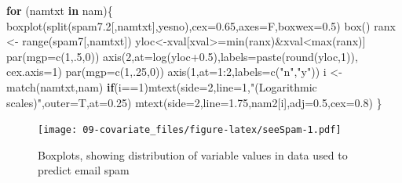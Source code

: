 \documentclass[
  10pt,
  b5paper]{book}
\newenvironment{Shaded}{\begin{snugshade}}{\end{snugshade}}
\newcommand{\AttributeTok}[1]{\textcolor[rgb]{0.77,0.63,0.00}{#1}}
\newcommand{\ControlFlowTok}[1]{\textcolor[rgb]{0.13,0.29,0.53}{\textbf{#1}}}
\newcommand{\DecValTok}[1]{\textcolor[rgb]{0.00,0.00,0.81}{#1}}
\newcommand{\FloatTok}[1]{\textcolor[rgb]{0.00,0.00,0.81}{#1}}
\newcommand{\FunctionTok}[1]{\textcolor[rgb]{0.00,0.00,0.00}{#1}}
\newcommand{\NormalTok}[1]{#1}
\newcommand{\OtherTok}[1]{\textcolor[rgb]{0.56,0.35,0.01}{#1}}
\newcommand{\SpecialCharTok}[1]{\textcolor[rgb]{0.00,0.00,0.00}{#1}}
\newcommand{\StringTok}[1]{\textcolor[rgb]{0.31,0.60,0.02}{#1}}
\begin{document}
\begin{Shaded}
\begin{Highlighting}[]
  \ControlFlowTok{for}\NormalTok{ (namtxt }\ControlFlowTok{in}\NormalTok{ nam)\{}
    \FunctionTok{boxplot}\NormalTok{(}\FunctionTok{split}\NormalTok{(spam7}\FloatTok{.2}\NormalTok{[,namtxt],yesno),}\AttributeTok{cex=}\FloatTok{0.65}\NormalTok{,}\AttributeTok{axes=}\NormalTok{F,}\AttributeTok{boxwex=}\FloatTok{0.5}\NormalTok{)}
    \FunctionTok{box}\NormalTok{()}
\NormalTok{    ranx }\OtherTok{\textless{}{-}} \FunctionTok{range}\NormalTok{(spam7[,namtxt])}
\NormalTok{    yloc}\OtherTok{\textless{}{-}}\NormalTok{xval[xval}\SpecialCharTok{\textgreater{}=}\FunctionTok{min}\NormalTok{(ranx)}\SpecialCharTok{\&}\NormalTok{xval}\SpecialCharTok{\textless{}}\FunctionTok{max}\NormalTok{(ranx)]}
    \FunctionTok{par}\NormalTok{(}\AttributeTok{mgp=}\FunctionTok{c}\NormalTok{(}\DecValTok{1}\NormalTok{,.}\DecValTok{5}\NormalTok{,}\DecValTok{0}\NormalTok{))}
    \FunctionTok{axis}\NormalTok{(}\DecValTok{2}\NormalTok{,}\AttributeTok{at=}\FunctionTok{log}\NormalTok{(yloc}\FloatTok{+0.5}\NormalTok{),}\AttributeTok{labels=}\FunctionTok{paste}\NormalTok{(}\FunctionTok{round}\NormalTok{(yloc,}\DecValTok{1}\NormalTok{)), }\AttributeTok{cex.axis=}\DecValTok{1}\NormalTok{)}
    \FunctionTok{par}\NormalTok{(}\AttributeTok{mgp=}\FunctionTok{c}\NormalTok{(}\DecValTok{1}\NormalTok{,.}\DecValTok{25}\NormalTok{,}\DecValTok{0}\NormalTok{))}
    \FunctionTok{axis}\NormalTok{(}\DecValTok{1}\NormalTok{,}\AttributeTok{at=}\DecValTok{1}\SpecialCharTok{:}\DecValTok{2}\NormalTok{,}\AttributeTok{labels=}\FunctionTok{c}\NormalTok{(}\StringTok{"n"}\NormalTok{,}\StringTok{"y"}\NormalTok{))}
\NormalTok{    i }\OtherTok{\textless{}{-}} \FunctionTok{match}\NormalTok{(namtxt,nam)}
    \ControlFlowTok{if}\NormalTok{(i}\SpecialCharTok{==}\DecValTok{1}\NormalTok{)}\FunctionTok{mtext}\NormalTok{(}\AttributeTok{side=}\DecValTok{2}\NormalTok{,}\AttributeTok{line=}\DecValTok{1}\NormalTok{,}\StringTok{"(Logarithmic scales)"}\NormalTok{,}\AttributeTok{outer=}\NormalTok{T,}\AttributeTok{at=}\FloatTok{0.25}\NormalTok{)}
    \FunctionTok{mtext}\NormalTok{(}\AttributeTok{side=}\DecValTok{2}\NormalTok{,}\AttributeTok{line=}\FloatTok{1.75}\NormalTok{,nam2[i],}\AttributeTok{adj=}\FloatTok{0.5}\NormalTok{,}\AttributeTok{cex=}\FloatTok{0.8}\NormalTok{)}
\NormalTok{  \}}
\end{Highlighting}
\end{Shaded}

\begin{figure}
\centering
\texttt{[image: 09-covariate\_files/figure-latex/seeSpam-1.pdf]}
\caption{\label{fig:seeSpam}Boxplots, showing distribution of variable values
in data used to predict email spam}
\end{figure}
\end{document}
